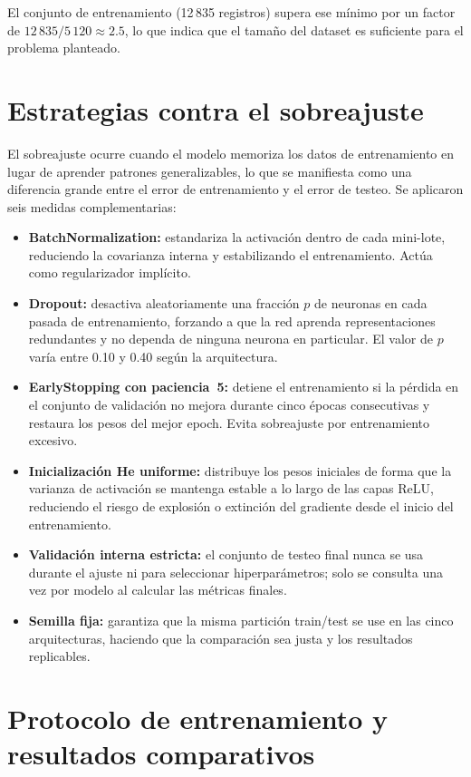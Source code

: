\documentclass[12pt, a4paper]{report}
\begin{document}
El conjunto de entrenamiento (12\,835 registros) supera ese mínimo por un factor de $12\,835 / 5\,120 \approx 2.5$, lo que indica que el tamaño del dataset es suficiente para el problema planteado.

\section{Estrategias contra el sobreajuste}

El sobreajuste ocurre cuando el modelo memoriza los datos de entrenamiento en lugar de aprender patrones generalizables, lo que se manifiesta como una diferencia grande entre el error de entrenamiento y el error de testeo. Se aplicaron seis medidas complementarias:

\begin{itemize}
  \item \textbf{BatchNormalization:} estandariza la activación dentro de cada mini-lote, reduciendo la covarianza interna y estabilizando el entrenamiento. Actúa como regularizador implícito.
  \item \textbf{Dropout:} desactiva aleatoriamente una fracción $p$ de neuronas en cada pasada de entrenamiento, forzando a que la red aprenda representaciones redundantes y no dependa de ninguna neurona en particular. El valor de $p$ varía entre 0.10 y 0.40 según la arquitectura.
  \item \textbf{EarlyStopping con paciencia~5:} detiene el entrenamiento si la pérdida en el conjunto de validación no mejora durante cinco épocas consecutivas y restaura los pesos del mejor epoch. Evita sobreajuste por entrenamiento excesivo.
  \item \textbf{Inicialización He uniforme:} distribuye los pesos iniciales de forma que la varianza de activación se mantenga estable a lo largo de las capas ReLU, reduciendo el riesgo de explosión o extinción del gradiente desde el inicio del entrenamiento.
  \item \textbf{Validación interna estricta:} el conjunto de testeo final nunca se usa durante el ajuste ni para seleccionar hiperparámetros; solo se consulta una vez por modelo al calcular las métricas finales.
  \item \textbf{Semilla fija:} garantiza que la misma partición train/test se use en las cinco arquitecturas, haciendo que la comparación sea justa y los resultados replicables.
\end{itemize}

\section{Protocolo de entrenamiento y resultados comparativos}
\end{document}
